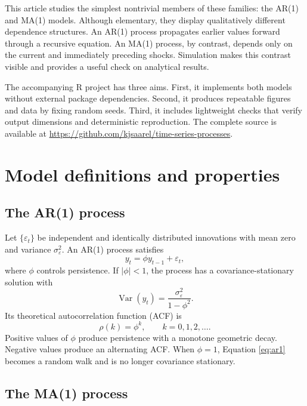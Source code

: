 \documentclass[10pt]{article}
\begin{document}
This article studies the simplest nontrivial members of these families: the
AR(1) and MA(1) models. Although elementary, they display qualitatively
different dependence structures. An AR(1) process propagates earlier values
forward through a recursive equation. An MA(1) process, by contrast, depends
only on the current and immediately preceding shocks. Simulation makes this
contrast visible and provides a useful check on analytical results.

The accompanying R project has three aims. First, it implements both models
without external package dependencies. Second, it produces repeatable figures
and data by fixing random seeds. Third, it includes lightweight checks that
verify output dimensions and deterministic reproduction. The complete source
is available at
\url{https://github.com/kjsaarel/time-series-processes}.

\section{Model definitions and properties}

\subsection{The AR(1) process}

Let $\{\varepsilon_t\}$ be independent and identically distributed innovations
with mean zero and variance $\sigma_\varepsilon^2$. An AR(1) process satisfies
\begin{equation}
  y_t = \phi y_{t-1} + \varepsilon_t,
  \label{eq:ar1}
\end{equation}
where $\phi$ controls persistence. If $|\phi|<1$, the process has a
covariance-stationary solution with
\begin{equation}
  \operatorname{Var}(y_t)
  = \frac{\sigma_\varepsilon^2}{1-\phi^2}.
\end{equation}
Its theoretical autocorrelation function (ACF) is
\begin{equation}
  \rho(k)=\phi^k,\qquad k=0,1,2,\ldots.
  \label{eq:aracf}
\end{equation}
Positive values of $\phi$ produce persistence with a monotone geometric decay.
Negative values produce an alternating ACF. When $\phi=1$, Equation
\eqref{eq:ar1} becomes a random walk and is no longer covariance stationary.

\subsection{The MA(1) process}
\end{document}
